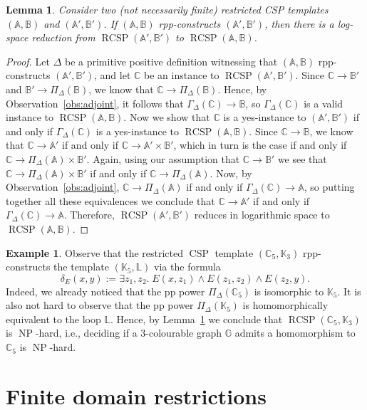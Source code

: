 \documentclass{article}
\newtheorem{lemma}[theorem]{Lemma}
\theoremstyle{definition}
\newtheorem{example}[theorem]{Example}
\theoremstyle{remark}
\DeclareMathOperator{\NP}{NP}
\DeclareMathOperator{\CSP}{CSP}
\DeclareMathOperator{\RCSP}{RCSP}
\newcommand{\bA}{{\mathbb A}}
\newcommand{\bB}{{\mathbb B}}
\newcommand{\bC}{{\mathbb C}}
\newcommand{\bG}{{\mathbb G}}
\newcommand{\bK}{{\mathbb K}}
\newcommand{\bL}{{\mathbb L}}
\begin{document}
\begin{lemma}\label{lem:rpp-constructions}
    Consider two (not necessarily finite) restricted CSP templates $(\bA,\bB)$ and
    $(\bA',\bB')$. If $(\bA,\bB)$ rpp-constructs $(\bA',\bB')$, then there is a log-space
    reduction from $\RCSP(\bA',\bB')$ to $\RCSP(\bA,\bB)$.
\end{lemma}
\begin{proof}
    Let $\Delta$ be a primitive positive definition witnessing that
    $(\bA,\bB)$ rpp-constructs $(\bA',\bB')$, and let $\bC$ be an instance to $\RCSP(\bA',\bB')$.
    Since $\bC\to  \bB'$ and $\bB'\to \Pi_\Delta(\bB)$, we know that $\bC\to \Pi_\Delta(\bB)$.
    Hence, by Observation~\ref{obs:adjoint}, it follows that $\Gamma_\Delta(\bC)\to \bB$, 
    so $\Gamma_\Delta(\bC)$ is a valid instance to $\RCSP(\bA,\bB)$. Now we show that $\bC$
    is a yes-instance to $(\bA',\bB')$ if and only if $\Gamma_\Delta(\bC)$ is a yes-instance
    to $\RCSP(\bA,\bB)$. Since $\bC\to \bB$, we know that $\bC\to \bA'$ if and only if
    $\bC\to \bA'\times \bB'$, which in turn is the case if and only if 
    $\bC\to  \Pi_\Delta(\bA)\times \bB'$. Again, using our assumption that $\bC\to  \bB'$
    we see that $\bC\to  \Pi_\Delta(\bA)\times \bB'$ if and only if $\bC\to \Pi_\Delta(\bA)$. 
    Now, by Observation~\ref{obs:adjoint}, $\bC \to \Pi_\Delta(\bA)$ if and only if
    $\Gamma_\Delta(\bC)\to \bA$, so putting together all these equivalences we conclude that
    $\bC\to \bA'$ if and only if $\Gamma_\Delta(\bC)\to \bA$. Therefore, $\RCSP(\bA',\bB')$
    reduces in logarithmic space to $\RCSP(\bA,\bB)$. 
\end{proof}

\begin{example}
    Observe that the restricted $\CSP$ template $(\bC_5,\bK_3)$ rpp-constructs the template
    $(\bK_5,\bL)$ via the formula
    \[
    \delta_E(x,y):=\exists z_1,z_2.\; E(x,z_1)\land E(z_1,z_2)\land E(z_2,y).
    \]
    Indeed, we already noticed that the pp power $\Pi_\Delta(\bC_5)$ is isomorphic to $\bK_5$. 
    It is also not hard to observe that the pp power $\Pi_\Delta(\bK_5)$ is homomorphically equivalent
    to the loop $\bL$. Hence, by Lemma~\ref{lem:rpp-constructions} we conclude that $\RCSP(\bC_5,\bK_3)$
    is $\NP$-hard, i.e., deciding if a $3$-colourable graph $\bG$ admits a homomorphism to $\bC_5$
    is $\NP$-hard.
\end{example}

\section{Finite domain restrictions}
\label{sect:finite-domain-restrictions}
\end{document}

